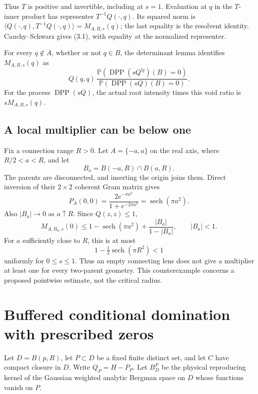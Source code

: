 \documentclass[11pt,a4paper]{article}
\theoremstyle{definition}
\theoremstyle{remark}
\numberwithin{equation}{section}
\begin{document}
Thus \(T\) is positive and invertible, including at \(s=1\). Evaluation at \(q\) in the \(T\)-inner product has representer \(T^{-1}Q(\cdot,q)\). Its squared norm is \(\langle Q(\cdot,q),T^{-1}Q(\cdot,q)\rangle=M_{A,B,s}(q)\); the last equality is the resolvent identity. Cauchy--Schwarz gives (3.1), with equality at the normalized representer.

For every \(q\notin A\), whether or not \(q\in B\), the determinant lemma identifies \(M_{A,B,s}(q)\) as \[
Q(q,q)\,
\frac{\mathbb P(\operatorname{DPP}(sQ^{!q})(B)=0)}
     {\mathbb P(\operatorname{DPP}(sQ)(B)=0)}.
\tag{3.2}
\] For the process \(\operatorname{DPP}(sQ)\), the actual root intensity times this void ratio is \(sM_{A,B,s}(q)\).

\hypertarget{a-local-multiplier-can-be-below-one}{%
\subsection{A local multiplier can be below one}\label{a-local-multiplier-can-be-below-one}}

Fix a connection range \(R>0\). Let \(A=\{-a,a\}\) on the real axis, where \(R/2<a<R\), and let \[
B_a=B(-a,R)\cap B(a,R).
\] The parents are disconnected, and inserting the origin joins them. Direct inversion of their \(2\times2\) coherent Gram matrix gives \[
P_A(0,0)=\frac{2e^{-\pi a^2}}{1+e^{-2\pi a^2}}
=\operatorname{sech}(\pi a^2).
\] Also \(|B_a|\to0\) as \(a\uparrow R\). Since \(Q(z,z)\le1\), \[
M_{A,B_a,s}(0)
\le1-\operatorname{sech}(\pi a^2)
       +\frac{|B_a|}{1-|B_a|},\qquad |B_a|<1.
\] For \(a\) sufficiently close to \(R\), this is at most \[
1-\tfrac12\operatorname{sech}(\pi R^2)<1
\] uniformly for \(0\le s\le1\). Thus an empty connecting lens does not give a multiplier at least one for every two-parent geometry. This counterexample concerns a proposed pointwise estimate, not the critical radius.

\hypertarget{buffered-conditional-domination-with-prescribed-zeros}{%
\section{Buffered conditional domination with prescribed zeros}\label{buffered-conditional-domination-with-prescribed-zeros}}

Let \(D=B(p,R)\), let \(P\subset D\) be a fixed finite distinct set, and let \(C\) have compact closure in \(D\). Write \(Q_P=H-P_P\). Let \(B_D^P\) be the physical reproducing kernel of the Gaussian weighted analytic Bergman space on \(D\) whose functions vanish on \(P\).
\end{document}
